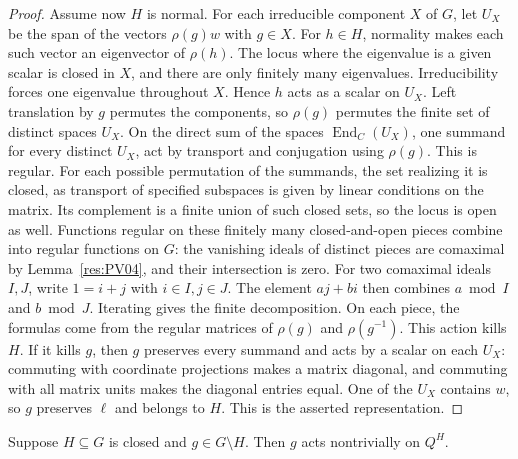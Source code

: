 \begin{proof}
Assume now \(H\) is normal. For each irreducible component
\(X\) of \(G\), let \(U_X\) be the span of the vectors
\(\rho(g)w\) with \(g\in X\). For \(h\in H\), normality
makes each such vector an eigenvector of \(\rho(h)\).
The locus where the eigenvalue is a given scalar is closed
in \(X\), and there are only finitely many eigenvalues.
Irreducibility forces one eigenvalue throughout \(X\).
Hence \(h\) acts as a scalar on \(U_X\).
Left translation by \(g\) permutes the components, so
\(\rho(g)\) permutes the finite set of distinct spaces \(U_X\).
On the direct sum of the spaces \(\operatorname{End}_C(U_X)\),
one summand for every distinct \(U_X\), act by transport and
conjugation using \(\rho(g)\). This is regular. For each possible
permutation of the summands, the set realizing it is
closed, as transport of specified subspaces is given by linear
conditions on the matrix. Its complement is a finite union of such
closed sets, so the locus is open as well. Functions regular on
these finitely many closed-and-open pieces combine into regular
functions on \(G\): the vanishing ideals of distinct pieces are
comaximal by Lemma~\ref{res:PV04}, and their intersection is zero.
For two comaximal ideals \(I,J\), write \(1=i+j\) with \(i\in I,j\in J\).
The element \(aj+bi\) then combines \(a\bmod I\) and \(b\bmod J\).
Iterating gives the finite decomposition.
On each piece, the formulas come from the regular matrices of
\(\rho(g)\) and \(\rho(g^{-1})\).
This action kills \(H\). If it kills \(g\), then \(g\)
preserves every summand and acts by a scalar on each \(U_X\):
commuting with coordinate projections makes a matrix diagonal,
and commuting with all matrix units makes the diagonal entries equal.
One of the \(U_X\) contains \(w\), so \(g\) preserves \(\ell\)
and belongs to \(H\). This is the asserted representation.
\end{proof}

\begin{lemma}
\label{res:PV16}
Suppose \(H\subseteq G\) is closed and \(g\in G\setminus H\).
Then \(g\) acts nontrivially on \(Q^H\).
\end{lemma}

